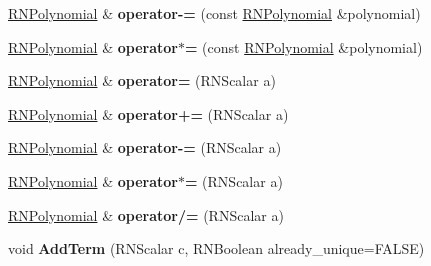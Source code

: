 \begin{DoxyCompactItemize}
\item 
\hyperlink{class_r_n_polynomial}{R\+N\+Polynomial} \& {\bfseries operator-\/=} (const \hyperlink{class_r_n_polynomial}{R\+N\+Polynomial} \&polynomial)\hypertarget{class_r_n_polynomial_ac433f05cf581511dd1955b7961c09a24}{}\label{class_r_n_polynomial_ac433f05cf581511dd1955b7961c09a24}

\item 
\hyperlink{class_r_n_polynomial}{R\+N\+Polynomial} \& {\bfseries operator$\ast$=} (const \hyperlink{class_r_n_polynomial}{R\+N\+Polynomial} \&polynomial)\hypertarget{class_r_n_polynomial_a36e6aa34ad1e60e02972e51c1a12ff84}{}\label{class_r_n_polynomial_a36e6aa34ad1e60e02972e51c1a12ff84}

\item 
\hyperlink{class_r_n_polynomial}{R\+N\+Polynomial} \& {\bfseries operator=} (R\+N\+Scalar a)\hypertarget{class_r_n_polynomial_a2e807a74d497624aecfe196db67069fc}{}\label{class_r_n_polynomial_a2e807a74d497624aecfe196db67069fc}

\item 
\hyperlink{class_r_n_polynomial}{R\+N\+Polynomial} \& {\bfseries operator+=} (R\+N\+Scalar a)\hypertarget{class_r_n_polynomial_a90a5802eef73c0fafabd3d4dde832286}{}\label{class_r_n_polynomial_a90a5802eef73c0fafabd3d4dde832286}

\item 
\hyperlink{class_r_n_polynomial}{R\+N\+Polynomial} \& {\bfseries operator-\/=} (R\+N\+Scalar a)\hypertarget{class_r_n_polynomial_a127c1ef8248bc58b22587989d2c5d290}{}\label{class_r_n_polynomial_a127c1ef8248bc58b22587989d2c5d290}

\item 
\hyperlink{class_r_n_polynomial}{R\+N\+Polynomial} \& {\bfseries operator$\ast$=} (R\+N\+Scalar a)\hypertarget{class_r_n_polynomial_a59c57173b9e6c5fb92f604712dc7ad8b}{}\label{class_r_n_polynomial_a59c57173b9e6c5fb92f604712dc7ad8b}

\item 
\hyperlink{class_r_n_polynomial}{R\+N\+Polynomial} \& {\bfseries operator/=} (R\+N\+Scalar a)\hypertarget{class_r_n_polynomial_a3aace0bf2f7a4ad99cf25a9b724169c7}{}\label{class_r_n_polynomial_a3aace0bf2f7a4ad99cf25a9b724169c7}

\item 
void {\bfseries Add\+Term} (R\+N\+Scalar c, R\+N\+Boolean already\+\_\+unique=F\+A\+L\+SE)\hypertarget{class_r_n_polynomial_a320912784fce364dfc98173ad3e28f67}{}\label{class_r_n_polynomial_a320912784fce364dfc98173ad3e28f67}


\end{DoxyCompactItemize}
